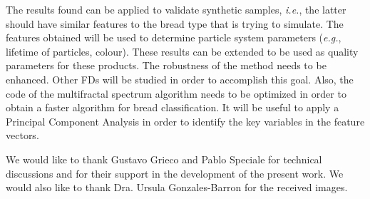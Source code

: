 The results found can be applied to validate synthetic samples, {\em i.e.}, the latter should have similar features to the bread type that is trying to simulate. The features obtained will be used to determine particle system parameters ({\em e.g.}, lifetime of particles, colour). These results can be extended to be used as quality parameters for these products. The robustness of the method needs to be enhanced. Other FDs will be studied in order to accomplish this goal. Also, the code of the multifractal spectrum algorithm needs to be optimized in order to obtain a faster algorithm for bread classification. It will be useful to apply a Principal Component Analysis in order to identify the key variables in the feature vectors. 

\begin{acknowledgements}
We would like to thank Gustavo Grieco and Pablo Speciale for technical discussions and for their support in the development of the present work. We would also like to thank Dra. Ursula Gonzales-Barron for the received images.
\end{acknowledgements}


%
%



